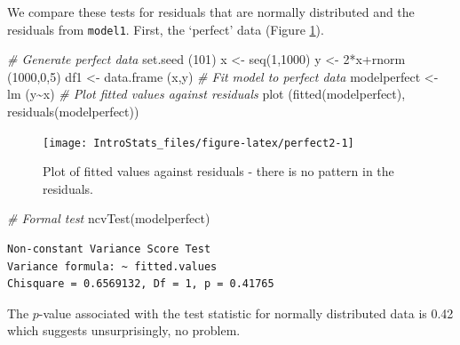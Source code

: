 \documentclass[
  oneside]{krantz}
\newenvironment{Shaded}{\begin{snugshade}}{\end{snugshade}}
\newcommand{\CommentTok}[1]{\textcolor[rgb]{0.56,0.35,0.01}{\textit{#1}}}
\newcommand{\DecValTok}[1]{\textcolor[rgb]{0.00,0.00,0.81}{#1}}
\newcommand{\FunctionTok}[1]{\textcolor[rgb]{0.00,0.00,0.00}{#1}}
\newcommand{\NormalTok}[1]{#1}
\newcommand{\OtherTok}[1]{\textcolor[rgb]{0.56,0.35,0.01}{#1}}
\newcommand{\SpecialCharTok}[1]{\textcolor[rgb]{0.00,0.00,0.00}{#1}}
\begin{document}
We compare these tests for residuals that are normally distributed and the residuals from \texttt{model1}. First, the `perfect' data (Figure \ref{fig:perfect2}).

\begin{Shaded}
\begin{Highlighting}[]
\CommentTok{\# Generate perfect data}
\FunctionTok{set.seed}\NormalTok{ (}\DecValTok{101}\NormalTok{)}
\NormalTok{x }\OtherTok{\textless{}{-}} \FunctionTok{seq}\NormalTok{(}\DecValTok{1}\NormalTok{,}\DecValTok{1000}\NormalTok{)}
\NormalTok{y }\OtherTok{\textless{}{-}} \DecValTok{2}\SpecialCharTok{*}\NormalTok{x}\SpecialCharTok{+}\FunctionTok{rnorm}\NormalTok{ (}\DecValTok{1000}\NormalTok{,}\DecValTok{0}\NormalTok{,}\DecValTok{5}\NormalTok{)}
\NormalTok{df1 }\OtherTok{\textless{}{-}} \FunctionTok{data.frame}\NormalTok{ (x,y)}
\CommentTok{\# Fit model to perfect data}
\NormalTok{modelperfect }\OtherTok{\textless{}{-}} \FunctionTok{lm}\NormalTok{ (y}\SpecialCharTok{\textasciitilde{}}\NormalTok{x)}
\CommentTok{\# Plot fitted values against residuals}
\FunctionTok{plot}\NormalTok{ (}\FunctionTok{fitted}\NormalTok{(modelperfect), }\FunctionTok{residuals}\NormalTok{(modelperfect))}
\end{Highlighting}
\end{Shaded}

\begin{figure}

{\centering \texttt{[image: IntroStats\_files/figure-latex/perfect2-1]} 

}

\caption{Plot of fitted values against residuals - there is no pattern in the residuals.}\label{fig:perfect2}
\end{figure}

\begin{Shaded}
\begin{Highlighting}[]
\CommentTok{\# Formal test}
\FunctionTok{ncvTest}\NormalTok{(modelperfect)}
\end{Highlighting}
\end{Shaded}

\begin{verbatim}
Non-constant Variance Score Test 
Variance formula: ~ fitted.values 
Chisquare = 0.6569132, Df = 1, p = 0.41765
\end{verbatim}

The \(p\)-value associated with the test statistic for normally distributed data is 0.42 which suggests unsurprisingly, no problem.
\end{document}

